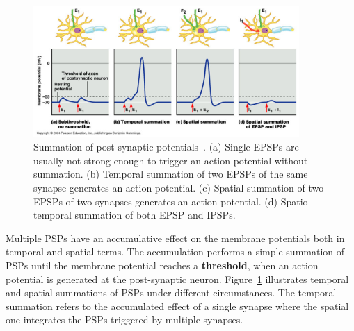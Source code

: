 \begin{figure}[b!]
	\centering
	\includegraphics[width=0.9\textwidth]{pics_snn/psp.png}
	\caption[Summation of post-synaptic potentials~\citep{reece2011campbell}.]{Summation of post-synaptic potentials~\citep{reece2011campbell}. 
		(a) Single EPSPs are usually not strong enough to trigger an action potential without summation. (b) Temporal summation of two EPSPs of the same synapse generates an action potential. (c) Spatial summation of two EPSPs of two synapses generates an action potential. (d) Spatio-temporal summation of both EPSP and IPSPs.
	}
	\label{Fig:psp_sum}
\end{figure}

Multiple PSPs have an accumulative effect on the membrane potentials both in temporal and spatial terms.
The accumulation performs a simple summation of PSPs until the membrane potential reaches a \textbf{threshold}, when an action potential is generated at the post-synaptic neuron.
Figure~\ref{Fig:psp_sum} illustrates temporal and spatial summations of PSPs under different circumstances.
The temporal summation refers to the accumulated effect of a single synapse where the spatial one integrates the PSPs triggered by multiple synapses.



